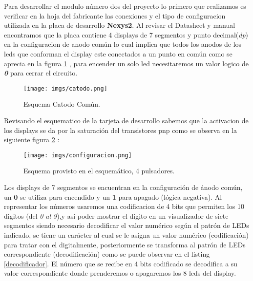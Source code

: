 \documentclass[paper=a4, fontsize=12pt]{article}        %
\numberwithin{equation}{section}                        %
\numberwithin{table}{section}                           %
\begin{document}
Para desarrollar el modulo número dos del proyecto lo primero que realizamos es verificar en la hoja del fabricante las conexiones y el tipo de configuracion utilizada en la placa de desarrollo \textbf{Nexys2}. Al revisar el Datasheet y manual encontramos que la placa contiene 4 displays de 7 segmentos y punto decimal(\textit{dp})  en la configuracion de anodo común lo cual implica que todos los anodos de los leds que conforman el display este conectados a un punto en común como se aprecia en la figura \ref{fig:catodo} , para encender un solo led necesitaremos un valor logico de \textbf{\textit{0}} para cerrar el circuito. 
\begin{figure}[H]
  \centering
     \texttt{[image: imgs/catodo.png]}
  \caption{Esquema Catodo Común.}
    \label{fig:catodo}
\end{figure}
Revisando el esquematico de la tarjeta de desarrollo sabemos que la activacion de los displays se da por la saturación del transistores pnp como se observa en la siguiente figura \ref{fig:esquema} :
\begin{figure}[H]
  \centering
     \texttt{[image: imgs/configuracion.png]}
  \caption{Esquema provisto en el esquemático, 4 pulsadores.}
    \label{fig:esquema}
\end{figure}
Los displays de 7 segmentos se encuentran en la configuración de ánodo común, un \textbf{0} se utiliza para encendido y un \textbf{1} para apagado (lógica negativa). Al representar los números usaremos una codificacion de 4 bits que permiten los 10 digitos (del \textit{0 al 9}),y asi poder mostrar el digito en un visualizador de siete segmentos siendo necesario decodificar el valor numérico según el patrón de LEDs indicado,  se tiene un carácter al cual se le asigna un valor numérico (codificación) para tratar con el digitalmente, posteriormente se transforma al patrón de LEDs correspondiente (decodificación) como se puede observar en el listing \ref{decodificador}. El número que se recibe en 4 bits codificado se decodifica a su valor correspondiente donde prenderemos o apagaremos los 8 leds del display.
\end{document}
